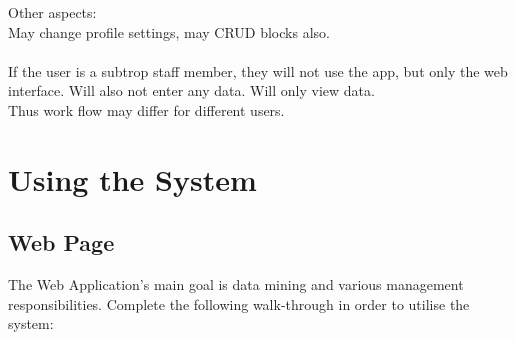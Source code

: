 \documentclass[11pt,a4paper,titlepage]{article}
\begin{document}
Other aspects:\\
May change profile settings, may CRUD blocks also.\\\\

If the user is a subtrop staff member, they will not use the app, but only the web interface. Will also not enter any data. Will only view data.\\

Thus work flow may differ for different users.



\section{Using the System}
\subsection{Web Page}
		 The Web Application's main goal is data mining and various management responsibilities. Complete the following walk-through in order to utilise the system:
\end{document}
